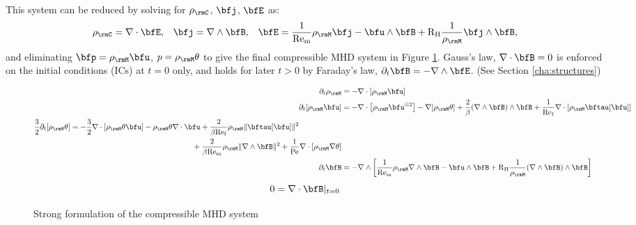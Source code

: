     This system can be reduced by solving for $\rho_{\rmC}$, $\bfj$, $\bfE$ as:
    \begin{align}
        \rho_{\rmC}  =  \nabla\cdot\bfE,  &&
               \bfj  =  \nabla\wedge\bfB,  &&
               \bfE  =  \frac{1}{\rmRem}\rho_{\rmM}\bfj - \bfu\wedge\bfB + \rmRH\frac{1}{\rho_{\rmM}}\bfj\wedge\bfB,
    \end{align}
    and eliminating $\bfp  =  \rho_{\rmM}\bfu$, $p  =  \rho_{\rmM}\theta$ to give the final compressible MHD system in Figure \ref{fig:compressible strong form}. Gauss's law, $\nabla\cdot\bfB  =  0$ is enforced on the initial conditions (ICs) at $t  =  0$ only, and holds for later $t  >  0$ by Faraday's law, $\partial_{t}\bfB  =  - \nabla\wedge\bfE$. (See Section \ref{cha:structures})

    \begin{figure}
        \centering
        \line
        \begin{align}
                           \partial_{t}\rho_{\rmM}          &=  - \nabla\cdot[\rho_{\rmM}\bfu]  \\
                           \partial_{t}[\rho_{\rmM}\bfu]    &=  - \nabla\cdot\left[\rho_{\rmM}\bfu^{\otimes 2}\right] - \nabla[\rho_{\rmM}\theta] + \frac{2}{\beta}(\nabla\wedge\bfB)\wedge\bfB + \frac{1}{\rmRef}\nabla\cdot[\rho_{\rmM}\bftau[\bfu]]  \\
            \begin{split}
                \frac{3}{2}\partial_{t}[\rho_{\rmM}\theta]  &=  - \frac{3}{2}\nabla\cdot[\rho_{\rmM}\theta\bfu] - \rho_{\rmM}\theta\nabla\cdot\bfu + \frac{2}{\beta\rmRef}\rho_{\rmM}\|\bftau[\bfu]\|^{2}  \\
                    &\qquad\qquad\qquad\qquad\qquad\qquad\qquad\qquad+ \frac{2}{\beta\rmRem}\rho_{\rmM}\|\nabla\wedge\bfB\|^{2} + \frac{1}{\rmPe}\nabla\cdot[\rho_{\rmM}\nabla\theta]
            \end{split}  \\
                           \partial_{t}\bfB                 &=  - \nabla\wedge\left[\frac{1}{\rmRem}\rho_{\rmM}\nabla\wedge\bfB - \bfu\wedge\bfB + \rmRH\frac{1}{\rho_{\rmM}}(\nabla\wedge\bfB)\wedge\bfB\right]
        \end{align}
        \shortline
        \begin{equation}
            0  =  \nabla\cdot\bfB|_{t = 0}
        \end{equation}
        \line
        \caption{Strong formulation of the compressible MHD system}
        \label{fig:compressible strong form}
    \end{figure}

